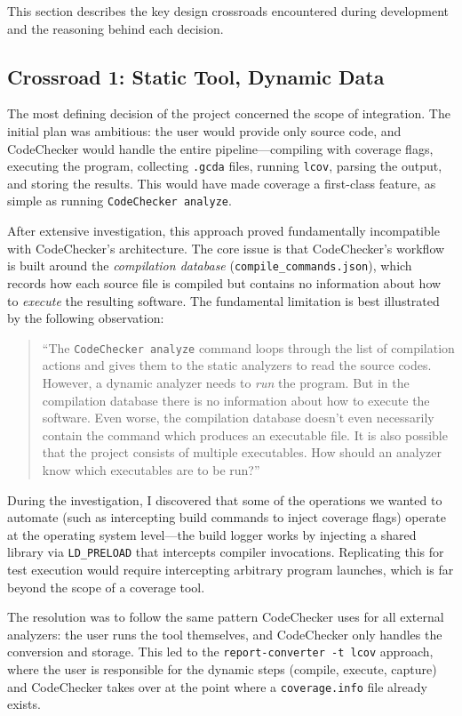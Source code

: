 This section describes the key design crossroads encountered during development and the reasoning behind each decision.

\subsection{Crossroad 1: Static Tool, Dynamic Data}

The most defining decision of the project concerned the scope of integration. The initial plan was ambitious: the user would provide only source code, and CodeChecker would handle the entire pipeline---compiling with coverage flags, executing the program, collecting \texttt{.gcda} files, running \texttt{lcov}, parsing the output, and storing the results. This would have made coverage a first-class feature, as simple as running \texttt{CodeChecker analyze}.

After extensive investigation, this approach proved fundamentally incompatible with CodeChecker's architecture. The core issue is that CodeChecker's workflow is built around the \emph{compilation database} (\texttt{compile\_commands.json}), which records how each source file is compiled but contains no information about how to \emph{execute} the resulting software. The fundamental limitation is best illustrated by the following observation:

\begin{quote}
``The \texttt{CodeChecker analyze} command loops through the list of compilation actions and gives them to the static analyzers to read the source codes. However, a dynamic analyzer needs to \emph{run} the program. But in the compilation database there is no information about how to execute the software. Even worse, the compilation database doesn't even necessarily contain the command which produces an executable file. It is also possible that the project consists of multiple executables. How should an analyzer know which executables are to be run?''
\end{quote}

During the investigation, I discovered that some of the operations we wanted to automate (such as intercepting build commands to inject coverage flags) operate at the operating system level---the build logger works by injecting a shared library via \texttt{LD\_PRELOAD} that intercepts compiler invocations. Replicating this for test execution would require intercepting arbitrary program launches, which is far beyond the scope of a coverage tool.

The resolution was to follow the same pattern CodeChecker uses for all external analyzers: the user runs the tool themselves, and CodeChecker only handles the conversion and storage. This led to the \texttt{report-converter -t lcov} approach, where the user is responsible for the dynamic steps (compile, execute, capture) and CodeChecker takes over at the point where a \texttt{coverage.info} file already exists.

